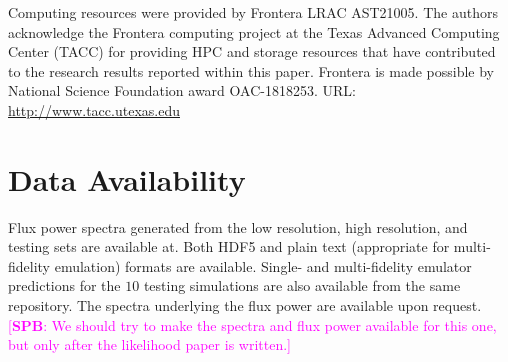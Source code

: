 \documentclass[a4paper,11pt]{article}
\newcommand{\spb}[1]{{\textcolor{magenta}{[{\bf SPB}: #1]}}}
\begin{document}
Computing resources were provided by Frontera LRAC AST21005.
The authors acknowledge the Frontera computing project at the Texas Advanced Computing Center (TACC) for providing HPC and storage resources that have contributed to the research results reported within this paper.
Frontera is made possible by National Science Foundation award OAC-1818253.
URL: \url{http://www.tacc.utexas.edu}

\section*{Data Availability}
Flux power spectra generated from the low resolution, high resolution, and testing sets are available at.
Both HDF5 and plain text (appropriate for multi-fidelity emulation) formats are available.
Single- and multi-fidelity emulator predictions for the $10$ testing simulations are also available from the same repository.
The spectra underlying the flux power are available upon request.
\spb{We should try to make the spectra and flux power available for this one, but only after the likelihood paper is written.}




\appendix

\label{lastpage}
\end{document}
